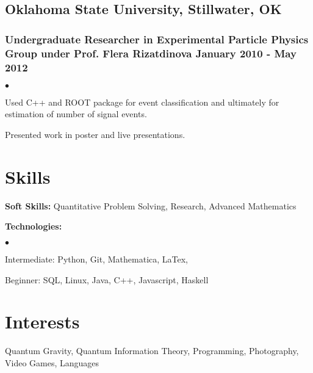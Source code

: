 \documentclass[letterpaper]{article}
\renewenvironment{itemize}{
  \begin{list}{$\bullet$}{
    \setlength{\itemsep}{0em}
    \setlength{\parskip}{0em}
    \setlength{\parsep}{0em} 
    \setlength{\topsep}{0em} 
  }
}{
  \end{list}
}
\begin{document}
\subsection*{Oklahoma State University, Stillwater, OK}
\subsubsection*{Undergraduate Researcher in Experimental Particle Physics Group under Prof. Flera Rizatdinova \hfill January 2010 - May 2012}
    \begin{itemize}
        \item Used C++ and ROOT package for event classification and ultimately for estimation of number of signal events.
        \item Presented work in poster and live presentations.
    \end{itemize}
    

\section*{Skills}

{\bf Soft Skills:} Quantitative Problem Solving, Research, Advanced Mathematics

{\bf Technologies:}
\begin{itemize}
	\item[] Intermediate: Python, Git, Mathematica, LaTex, 
	\item[] Beginner: SQL, Linux, Java, C++, Javascript, Haskell
\end{itemize}
 


\section*{Interests}

Quantum Gravity, Quantum Information Theory, Programming, Photography, Video Games, Languages
\end{document}
